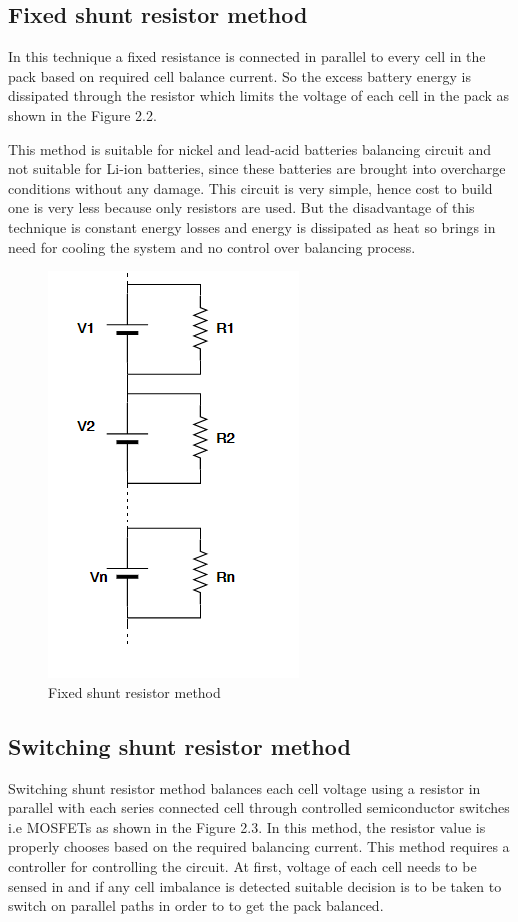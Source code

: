 \subsection{Fixed shunt resistor method}
In this technique a fixed  resistance is connected in parallel to every cell in the pack based on required cell balance current. So the excess battery energy is dissipated through the resistor which limits the voltage of each cell in the pack as shown in the Figure 2.2.

This method is suitable for nickel and lead‐acid batteries balancing circuit and not suitable for Li-ion batteries, since these batteries are brought into overcharge conditions without any damage\cite{hemavathi}. This circuit is very simple, hence cost to build one is very less because only resistors are used. But the disadvantage of this technique is constant energy losses and energy is dissipated as heat so brings in need for cooling the system and no control over balancing process.

\begin{figure}[h!]
    \centering
    \includegraphics[]{Chapter2/Figures/fixedR.PNG}
    \caption{Fixed shunt resistor method}
\end{figure}

\subsection{Switching shunt resistor method}
Switching shunt resistor method balances each cell voltage using a resistor in parallel with each series connected cell through controlled  semiconductor switches i.e MOSFETs as shown in the Figure 2.3. In this method, the resistor value is properly chooses based on the required balancing current. This method requires a controller for controlling the circuit. At first, voltage of each cell needs to be sensed in and if any cell imbalance is detected suitable decision is to be taken to switch on parallel paths in order to to get the pack balanced.

